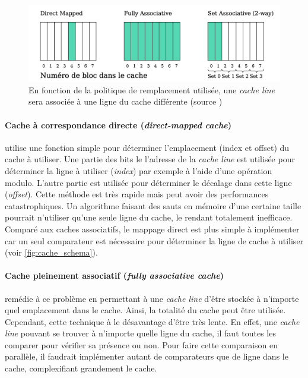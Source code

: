\begin{figure}
    \center
    \includegraphics[width=12cm]{images/cache_associativite.png}
    \caption{\label{pic:cache_associativite} En fonction de la politique de remplacement utilisée, une \textit{cache line} sera associée à une ligne du cache différente (source \cite{Meunier2017})}
\end{figure}

\paragraph{Cache à correspondance directe (\textit{direct-mapped cache})} utilise une fonction simple pour déterminer l'emplacement (index et offset) du cache à utiliser. Une partie des bits le l'adresse de la \textit{cache line} est utilisée pour déterminer la ligne à utiliser (\textit{index}) par exemple à l'aide d'une opération modulo. L'autre partie est utilisée pour déterminer le décalage dans cette ligne (\textit{offset}). Cette méthode est très rapide mais peut avoir des performances catastrophiques. Un algorithme faisant des sauts en mémoire d'une certaine taille pourrait n'utiliser qu'une seule ligne du cache, le rendant totalement inefficace. Comparé aux caches associatifs, le mappage direct est plus simple à implémenter car un seul comparateur est nécessaire pour déterminer la ligne de cache à utiliser (voir \autoref{fig:cache_schema}).

\paragraph{Cache pleinement associatif (\textit{fully associative cache})} remédie à ce problème en permettant à une \textit{cache line} d'être stockée à n'importe quel emplacement dans le cache. Ainsi, la totalité du cache peut être utilisée. Cependant, cette technique à le désavantage d'être très lente. En effet, une \textit{cache line} pouvant se trouver à n'importe quelle ligne du cache, il faut toutes les comparer pour vérifier sa présence ou non. Pour faire cette comparaison en parallèle, il faudrait implémenter autant de comparateurs que de ligne dans le cache, complexifiant grandement le cache.


